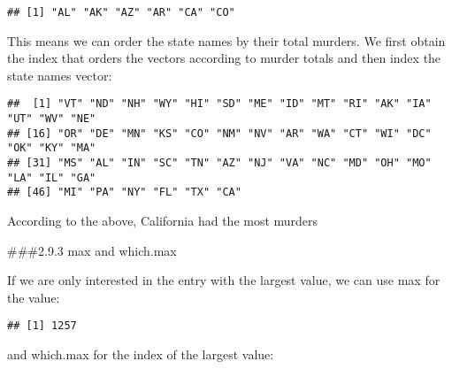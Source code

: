 \documentclass[
]{article}
\newenvironment{Shaded}{\begin{snugshade}}{\end{snugshade}}
\newcommand{\DecValTok}[1]{\textcolor[rgb]{0.00,0.00,0.81}{#1}}
\newcommand{\FunctionTok}[1]{\textcolor[rgb]{0.00,0.00,0.00}{#1}}
\newcommand{\NormalTok}[1]{#1}
\newcommand{\OtherTok}[1]{\textcolor[rgb]{0.56,0.35,0.01}{#1}}
\newcommand{\SpecialCharTok}[1]{\textcolor[rgb]{0.00,0.00,0.00}{#1}}
\begin{document}
\begin{Shaded}
\end{Shaded}

\begin{verbatim}
## [1] "AL" "AK" "AZ" "AR" "CA" "CO"
\end{verbatim}

This means we can order the state names by their total murders. We first
obtain the index that orders the vectors according to murder totals and
then index the state names vector:

\begin{Shaded}
\end{Shaded}

\begin{verbatim}
##  [1] "VT" "ND" "NH" "WY" "HI" "SD" "ME" "ID" "MT" "RI" "AK" "IA" "UT" "WV" "NE"
## [16] "OR" "DE" "MN" "KS" "CO" "NM" "NV" "AR" "WA" "CT" "WI" "DC" "OK" "KY" "MA"
## [31] "MS" "AL" "IN" "SC" "TN" "AZ" "NJ" "VA" "NC" "MD" "OH" "MO" "LA" "IL" "GA"
## [46] "MI" "PA" "NY" "FL" "TX" "CA"
\end{verbatim}

According to the above, California had the most murders

\#\#\#2.9.3 max and which.max

If we are only interested in the entry with the largest value, we can
use max for the value:

\begin{Shaded}
\end{Shaded}

\begin{verbatim}
## [1] 1257
\end{verbatim}

and which.max for the index of the largest value:

\begin{Shaded}
\end{Shaded}
\end{document}

